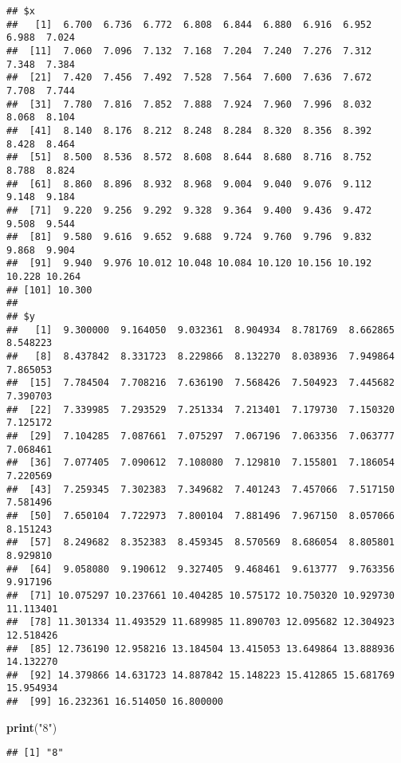 \documentclass[]{article}
\newenvironment{Shaded}{\begin{snugshade}}{\end{snugshade}}
\newcommand{\KeywordTok}[1]{\textcolor[rgb]{0.13,0.29,0.53}{\textbf{#1}}}
\newcommand{\StringTok}[1]{\textcolor[rgb]{0.31,0.60,0.02}{#1}}
\newcommand{\NormalTok}[1]{#1}
\begin{document}
\begin{verbatim}
## $x
##   [1]  6.700  6.736  6.772  6.808  6.844  6.880  6.916  6.952  6.988  7.024
##  [11]  7.060  7.096  7.132  7.168  7.204  7.240  7.276  7.312  7.348  7.384
##  [21]  7.420  7.456  7.492  7.528  7.564  7.600  7.636  7.672  7.708  7.744
##  [31]  7.780  7.816  7.852  7.888  7.924  7.960  7.996  8.032  8.068  8.104
##  [41]  8.140  8.176  8.212  8.248  8.284  8.320  8.356  8.392  8.428  8.464
##  [51]  8.500  8.536  8.572  8.608  8.644  8.680  8.716  8.752  8.788  8.824
##  [61]  8.860  8.896  8.932  8.968  9.004  9.040  9.076  9.112  9.148  9.184
##  [71]  9.220  9.256  9.292  9.328  9.364  9.400  9.436  9.472  9.508  9.544
##  [81]  9.580  9.616  9.652  9.688  9.724  9.760  9.796  9.832  9.868  9.904
##  [91]  9.940  9.976 10.012 10.048 10.084 10.120 10.156 10.192 10.228 10.264
## [101] 10.300
## 
## $y
##   [1]  9.300000  9.164050  9.032361  8.904934  8.781769  8.662865  8.548223
##   [8]  8.437842  8.331723  8.229866  8.132270  8.038936  7.949864  7.865053
##  [15]  7.784504  7.708216  7.636190  7.568426  7.504923  7.445682  7.390703
##  [22]  7.339985  7.293529  7.251334  7.213401  7.179730  7.150320  7.125172
##  [29]  7.104285  7.087661  7.075297  7.067196  7.063356  7.063777  7.068461
##  [36]  7.077405  7.090612  7.108080  7.129810  7.155801  7.186054  7.220569
##  [43]  7.259345  7.302383  7.349682  7.401243  7.457066  7.517150  7.581496
##  [50]  7.650104  7.722973  7.800104  7.881496  7.967150  8.057066  8.151243
##  [57]  8.249682  8.352383  8.459345  8.570569  8.686054  8.805801  8.929810
##  [64]  9.058080  9.190612  9.327405  9.468461  9.613777  9.763356  9.917196
##  [71] 10.075297 10.237661 10.404285 10.575172 10.750320 10.929730 11.113401
##  [78] 11.301334 11.493529 11.689985 11.890703 12.095682 12.304923 12.518426
##  [85] 12.736190 12.958216 13.184504 13.415053 13.649864 13.888936 14.132270
##  [92] 14.379866 14.631723 14.887842 15.148223 15.412865 15.681769 15.954934
##  [99] 16.232361 16.514050 16.800000
\end{verbatim}

\begin{Shaded}
\begin{Highlighting}[]
\KeywordTok{print}\NormalTok{(}\StringTok{"8"}\NormalTok{)}
\end{Highlighting}
\end{Shaded}

\begin{verbatim}
## [1] "8"
\end{verbatim}
\end{document}
